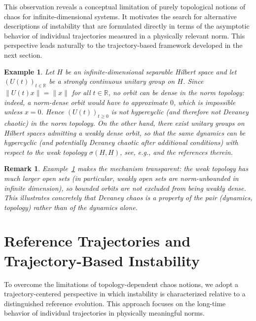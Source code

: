 \documentclass[12pt]{article}
\newtheorem{remark}[theorem]{Remark}
\newtheorem{example}[theorem]{Example}
\begin{document}
This observation reveals a conceptual limitation of purely topological notions of chaos for infinite-dimensional systems. It motivates the search for alternative descriptions of instability that are formulated directly in terms of the asymptotic behavior of individual trajectories measured in a physically relevant norm. This perspective leads naturally to the trajectory-based framework
developed in the next section.

\begin{example}\label{ex:weak_vs_norm}
Let $H$ be an infinite-dimensional separable Hilbert space and let $(U(t))_{t\in\mathbb{R}}$ be a strongly continuous unitary group on $H$. Since $\|U(t)x\|=\|x\|$ for all $t\in\mathbb{R}$, no orbit can be dense in the norm topology: indeed, a norm-dense orbit would have to approximate $0$, which is impossible unless $x=0$.
Hence $(U(t))_{t\ge 0}$ is not hypercyclic (and therefore not Devaney chaotic) in the norm topology. On the other hand, there exist unitary groups on Hilbert spaces admitting a weakly dense orbit, so that the same dynamics can be hypercyclic (and potentially Devaney chaotic after additional conditions) with respect to the weak topology $\sigma(H,H)$, see, e.g.,
\cite{BayartMatheron2009,GrosseErdmannPeris2011} and the references therein.
\end{example}

\begin{remark}\label{rem:why_example_matters}
Example~\ref{ex:weak_vs_norm} makes the mechanism transparent: the weak topology has much larger open sets (in particular, weakly open sets are norm-unbounded in infinite dimension), so bounded orbits are not excluded from being weakly dense. This illustrates concretely that Devaney chaos is a property of the pair \emph{(dynamics, topology)} rather than of the dynamics alone.
\end{remark}

\section{Reference Trajectories and Trajectory-Based Instability}\label{sec:Reftraj}

To overcome the limitations of topology-dependent chaos notions, we adopt a trajectory-centered perspective in which instability is characterized relative to a distinguished reference evolution. This approach focuses on the long-time behavior of individual trajectories in physically meaningful norms.
\end{document}
